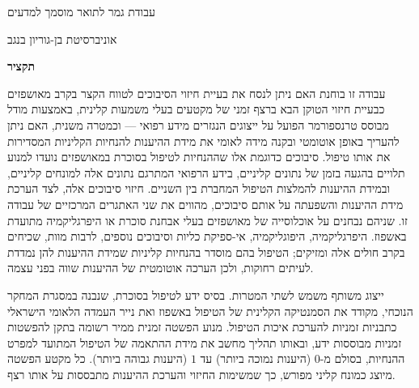\thispagestyle{empty}


\begingroup
\singlespacing
\setlength{\parskip}{2pt}


\begin{center}
    \Large
    \thesistitlehe

    \vspace{0.25cm}
    \large
    \thesisauthornamehe

    \vspace{0.25cm}
    \large
    עבודת גמר לתואר מוסמך למדעים

    \vspace{0.1cm}
    \large
    אוניברסיטת בן-גוריון בנגב

    \vspace{0.1cm}
    \large
    \thesisyearhe

    \vspace{0.4cm}
    \Large
    \textbf{תקציר}
\end{center}

עבודה זו בוחנת האם ניתן לנסח את בעיית חיזוי הסיבוכים לטווח הקצר בקרב מאושפזים כבעיית חיזוי הטוקן הבא ברצף זמני של מקטעים בעלי משמעות קלינית, באמצעות מודל מבוסס טרנספורמר הפועל על ייצוגים הנגזרים מידע רפואי --- וכמטרה משנית, האם ניתן להעריך באופן אוטומטי ובקנה מידה לאומי את מידת ההיענות להנחיות הקליניות המסדירות את אותו טיפול. סיבוכים כדוגמת אלו שההנחיות לטיפול בסוכרת במאושפזים נועדו למנוע תלויים בהגעה בזמן של נתונים קליניים, בידע הרפואי המתרגם נתונים אלה למונחים קליניים, ובמידת ההיענות להמלצות הטיפול המחברת בין השניים. חיזוי סיבוכים אלה, לצד הערכת מידת ההיענות והשפעתה על אותם סיבוכים, מהווים את שני האתגרים המרכזיים של עבודה זו. שניהם נבחנים על אוכלוסייה של מאושפזים בעלי אבחנת סוכרת או היפרגליקמיה מתועדת באשפוז. היפרגליקמיה, היפוגליקמיה, אי-ספיקת כליות וסיבוכים נוספים, לרבות מוות, שכיחים בקרב חולים אלה ומזיקים; הטיפול בהם מוסדר בהנחיות קליניות שמידת ההיענות להן נמדדת לעיתים רחוקות, ולכן הערכה אוטומטית של ההיענות שווה בפני עצמה.

ייצוג משותף משמש לשתי המטרות. בסיס ידע לטיפול בסוכרת, שנבנה במסגרת המחקר הנוכחי, מקודד את הסמנטיקה הקלינית של הטיפול באשפוז ואת נייר העמדה הלאומי הישראלי כתבניות זמניות להערכת איכות הטיפול. מנוע הפשטה זמנית ממיר רשומה בתקן  להפשטות זמניות מבוססות ידע, ובאותו תהליך מחשב את מידת ההתאמה של הטיפול המתועד למפרט ההנחיות, בסולם מ-$0$ (היענות נמוכה ביותר) עד $1$ (היענות גבוהה ביותר). כל מקטע הפשטה מיוצג כמונח קליני מפורש, כך שמשימות החיזוי והערכת ההיענות מתבססות על אותו רצף.

